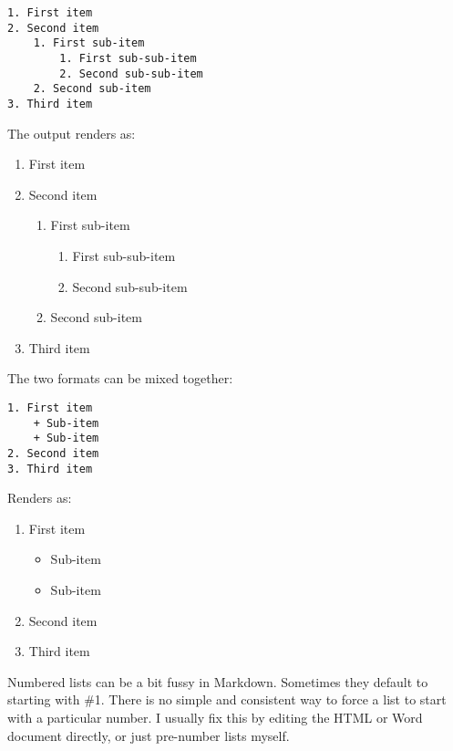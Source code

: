 \documentclass[
]{article}
\providecommand{\tightlist}{%
  \setlength{\itemsep}{0pt}\setlength{\parskip}{0pt}}
\begin{document}
\begin{verbatim}
1. First item
2. Second item
    1. First sub-item
        1. First sub-sub-item
        2. Second sub-sub-item
    2. Second sub-item
3. Third item
\end{verbatim}

The output renders as:

\begin{enumerate}
\def\labelenumi{\arabic{enumi}.}
\tightlist
\item
  First item
\item
  Second item

  \begin{enumerate}
  \def\labelenumii{\arabic{enumii}.}
  \tightlist
  \item
    First sub-item

    \begin{enumerate}
    \def\labelenumiii{\arabic{enumiii}.}
    \tightlist
    \item
      First sub-sub-item
    \item
      Second sub-sub-item
    \end{enumerate}
  \item
    Second sub-item
  \end{enumerate}
\item
  Third item
\end{enumerate}

The two formats can be mixed together:

\begin{verbatim}
1. First item
    + Sub-item
    + Sub-item
2. Second item
3. Third item
\end{verbatim}

Renders as:

\begin{enumerate}
\def\labelenumi{\arabic{enumi}.}
\tightlist
\item
  First item

  \begin{itemize}
  \tightlist
  \item
    Sub-item
  \item
    Sub-item
  \end{itemize}
\item
  Second item
\item
  Third item
\end{enumerate}

Numbered lists can be a bit fussy in Markdown. Sometimes they default to
starting with \#1. There is no simple and consistent way to force a list
to start with a particular number. I usually fix this by editing the
HTML or Word document directly, or just pre-number lists myself.
\end{document}
